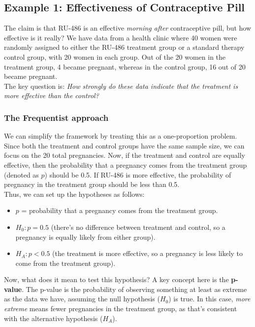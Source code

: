 \subsection{Example 1: Effectiveness of Contraceptive Pill}

The claim is that RU-486 is an effective \textit{morning after} contraceptive pill, but how effective is it really? We have data from a health clinic where 40 women were randomly assigned to either the RU-486 treatment group or a standard therapy control group, with 20 women in each group. Out of the 20 women in the treatment group, 4 became pregnant, whereas in the control group, 16 out of 20 became pregnant.\\

The key question is: \textit{How strongly do these data indicate that the treatment is more effective than the control?}

\subsubsection{The Frequentist approach}

We can simplify the framework by treating this as a one-proportion problem. Since both the treatment and control groups have the same sample size, we can focus on the 20 total pregnancies. Now, if the treatment and control are equally effective, then the probability that a pregnancy comes from the treatment group (denoted as \( p \)) should be 0.5. If RU-486 is more effective, the probability of pregnancy in the treatment group should be less than 0.5.\\

Thus, we can set up the hypotheses as follows:

\begin{itemize}
    \item \( p \) = probability that a pregnancy comes from the treatment group.
    \item \( H_0: p = 0.5 \) (there’s no difference between treatment and control, so a pregnancy is equally likely from either group).
    \item \( H_A: p < 0.5 \) (the treatment is more effective, so a pregnancy is less likely to come from the treatment group).
\end{itemize}

Now, what does it mean to test this hypothesis? A key concept here is the \textbf{p-value}. The p-value is the probability of observing something at least as extreme as the data we have, assuming the null hypothesis (\( H_0 \)) is true. In this case, \textit{more extreme} means fewer pregnancies in the treatment group, as that's consistent with the alternative hypothesis (\( H_A \)).\\

